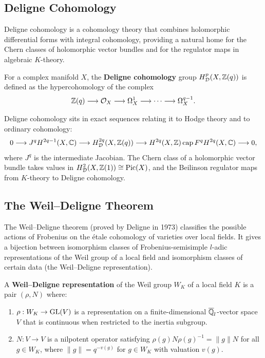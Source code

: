 \subsection{Deligne Cohomology}

Deligne cohomology is a cohomology theory that combines holomorphic differential forms with integral cohomology, providing a natural home for the Chern classes of holomorphic vector bundles and for the regulator maps in algebraic \(K\)-theory.

For a complex manifold \(X\), the \textbf{Deligne cohomology} group \(H^p_{\mathcal{D}}(X, \mathbb{Z}(q))\) is defined as the hypercohomology of the complex
\[
\mathbb{Z}(q) \longrightarrow \mathcal{O}_X \longrightarrow \Omega^1_X \longrightarrow \cdots \longrightarrow \Omega^{q-1}_X.
\]

Deligne cohomology sits in exact sequences relating it to Hodge theory and to ordinary cohomology:
\[
0 \longrightarrow J^q H^{2q-1}(X, \mathbb{C}) \longrightarrow H^{2q}_{\mathcal{D}}(X, \mathbb{Z}(q)) \longrightarrow H^{2q}(X, \mathbb{Z}) \operatorname{\mathrm{cap}} F^q H^{2q}(X, \mathbb{C}) \longrightarrow 0,
\]
where \(J^q\) is the intermediate Jacobian. The Chern class of a holomorphic vector bundle takes values in \(H^{2}_{\mathcal{D}}(X, \mathbb{Z}(1)) \cong \operatorname{Pic}(X)\), and the Beilinson regulator maps from \(K\)-theory to Deligne cohomology.

\subsection{The Weil--Deligne Theorem}

The Weil--Deligne theorem (proved by Deligne in 1973) classifies the possible actions of Frobenius on the \'etale cohomology of varieties over local fields. It gives a bijection between isomorphism classes of Frobenius-semisimple \(l\)-adic representations of the Weil group of a local field and isomorphism classes of certain data (the Weil--Deligne representation).

\begin{definition}
A \textbf{Weil--Deligne representation} of the Weil group \(W_K\) of a local field \(K\) is a pair \((\rho, N)\) where:
\begin{enumerate}
    \item \(\rho: W_K \to \operatorname{GL}(V)\) is a representation on a finite-dimensional \(\overline{\mathbb{Q}}_l\)-vector space \(V\) that is continuous when restricted to the inertia subgroup.
    \item \(N: V \to V\) is a nilpotent operator satisfying \(\rho(g) N \rho(g)^{-1} = \|g\| N\) for all \(g \in W_K\), where \(\|g\| = q^{-v(g)}\) for \(g \in W_K\) with valuation \(v(g)\).
\end{enumerate}
\end{definition}

